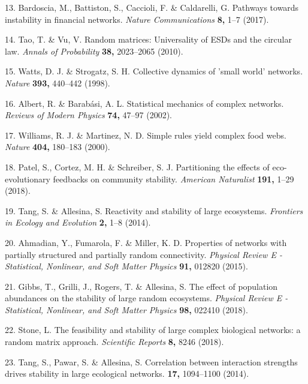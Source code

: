 \documentclass[]{article}
\begin{document}
\hypertarget{ref-Bardoscia2017}{}
13. Bardoscia, M., Battiston, S., Caccioli, F. \& Caldarelli, G.
Pathways towards instability in financial networks. \emph{Nature
Communications} \textbf{8,} 1--7 (2017).

\hypertarget{ref-Tao2010}{}
14. Tao, T. \& Vu, V. Random matrices: Universality of ESDs and the
circular law. \emph{Annals of Probability} \textbf{38,} 2023--2065
(2010).

\hypertarget{ref-Watts1998}{}
15. Watts, D. J. \& Strogatz, S. H. Collective dynamics of 'small world'
networks. \emph{Nature} \textbf{393,} 440--442 (1998).

\hypertarget{ref-Albert2002}{}
16. Albert, R. \& Barabási, A. L. Statistical mechanics of complex
networks. \emph{Reviews of Modern Physics} \textbf{74,} 47--97 (2002).

\hypertarget{ref-Williams2000}{}
17. Williams, R. J. \& Martinez, N. D. Simple rules yield complex food
webs. \emph{Nature} \textbf{404,} 180--183 (2000).

\hypertarget{ref-Patel2018}{}
18. Patel, S., Cortez, M. H. \& Schreiber, S. J. Partitioning the
effects of eco-evolutionary feedbacks on community stability.
\emph{American Naturalist} \textbf{191,} 1--29 (2018).

\hypertarget{ref-Tang2014b}{}
19. Tang, S. \& Allesina, S. Reactivity and stability of large
ecosystems. \emph{Frontiers in Ecology and Evolution} \textbf{2,} 1--8
(2014).

\hypertarget{ref-Ahmadian2015}{}
20. Ahmadian, Y., Fumarola, F. \& Miller, K. D. Properties of networks
with partially structured and partially random connectivity.
\emph{Physical Review E - Statistical, Nonlinear, and Soft Matter
Physics} \textbf{91,} 012820 (2015).

\hypertarget{ref-Gibbs2017}{}
21. Gibbs, T., Grilli, J., Rogers, T. \& Allesina, S. The effect of
population abundances on the stability of large random ecosystems.
\emph{Physical Review E - Statistical, Nonlinear, and Soft Matter
Physics} \textbf{98,} 022410 (2018).

\hypertarget{ref-Stone2017}{}
22. Stone, L. The feasibility and stability of large complex biological
networks: a random matrix approach. \emph{Scientific Reports}
\textbf{8,} 8246 (2018).

\hypertarget{ref-Tang2014c}{}
23. Tang, S., Pawar, S. \& Allesina, S. Correlation between interaction
strengths drives stability in large ecological networks. \textbf{17,}
1094--1100 (2014).
\end{document}
